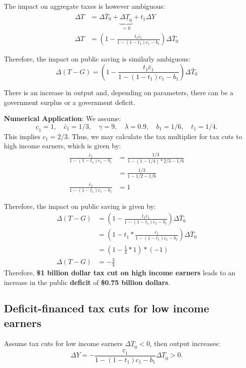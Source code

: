 \documentclass[]{book}
\theoremstyle{definition}
\theoremstyle{definition}
\theoremstyle{definition}
\theoremstyle{remark}
\begin{document}
The impact on aggregate taxes is however ambiguous: \[
\begin{aligned}
\Delta T    &=\Delta\bar{T}_{0}+\underbrace{\Delta\underline{T}_{0}}_{=0}+t_1\Delta Y\\
\Delta T    &=\left(1-\frac{t_1\bar{c}_{1}}{1-\left(1-t_{1}\right)c_{1}-b_{1}}\right)\Delta\bar{T}_{0}
\end{aligned}
\]

Therefore, the impact on public saving is similarly ambiguous:
\[\Delta\left(T-G\right)=\left(1-\frac{t_1\bar{c}_{1}}{1-\left(1-t_{1}\right)c_{1}-b_{1}}\right)\Delta\bar{T}_{0}\]

There is an increase in output and, depending on parameters, there can
be a government surplus or a government deficit.

\textbf{Numerical Application}: We assume:
\[\underline{c}_{1}=1, \quad \bar{c}_{1}=1/3,\quad \gamma=9, \quad\lambda=0.9,\quad b_1=1/6, \quad t_1=1/4.\]
This implies \(c_1=2/3.\) Thus, we may calculate the tax multiplier for
tax cuts to high income earners, which is given by: \[
\begin{aligned}
\frac{\bar{c}_{1}}{1-(1-t_1)c_{1}-b_{1}} &= \frac{1/3}{1-(1-1/4)*2/3-1/6}\\
&= \frac{1/3}{1-1/2-1/6}\\
\frac{\bar{c}_{1}}{1-(1-t_1)c_{1}-b_{1}} &=1
\end{aligned}
\]

Therefore, the impact on public saving is given by: \[
\begin{aligned}
\Delta\left(T-G\right)&=\left(1-\frac{t_1\bar{c}_{1}}{1-\left(1-t_{1}\right)c_{1}-b_{1}}\right)\Delta\bar{T}_{0}\\
&=\left(1-t_1*\frac{\bar{c}_{1}}{1-\left(1-t_{1}\right)c_{1}-b_{1}}\right)\Delta\bar{T}_{0}\\
&=\left(1-\frac{1}{4}*1\right)*(-1)\\
\Delta\left(T-G\right)&=-\frac{3}{4}
\end{aligned}
\] Therefore, \textbf{\$1 billion dollar tax cut on high income earners}
leads to an increase in the public \textbf{deficit} of \textbf{\$0.75
billion dollars}.

\subsection{Deficit-financed tax cuts for low income
earners}\label{deficit-financed-tax-cuts-for-low-income-earners}

Assume tax cuts for low income earners \(\Delta\underline{T}_{0}<0\),
then output increases:
\[\Delta Y=-\frac{\underline{c}_{1}}{1-\left(1-t_{1}\right)c_{1}-b_{1}}\Delta\underline{T}_{0}>0.\]
\end{document}
